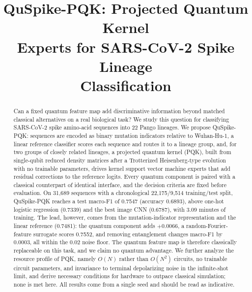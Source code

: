 \documentclass[conference]{IEEEtran}
\begin{document}
\raggedbottom

\title{QuSpike-PQK: Projected Quantum Kernel\\
Experts for SARS-CoV-2 Spike Lineage\\
Classification}
\author{}
\maketitle

\begin{abstract}
Can a fixed quantum feature map add discriminative information beyond matched classical alternatives on a real biological task? We study this question for classifying SARS-CoV-2 spike amino-acid sequences into 22 Pango lineages. We propose QuSpike-PQK: sequences are encoded as binary mutation indicators relative to Wuhan-Hu-1, a linear reference classifier scores each sequence and routes it to a lineage group, and, for two groups of closely related lineages, a projected quantum kernel (PQK), built from single-qubit reduced density matrices after a Trotterized Heisenberg-type evolution with no trainable parameters, drives kernel support vector machine experts that add residual corrections to the reference logits. Every quantum component is paired with a classical counterpart of identical interface, and the decision criteria are fixed before evaluation. On 31,689 sequences with a chronological 22,175/9,514 training/test split, QuSpike-PQK reaches a test macro-F1 of 0.7547 (accuracy 0.6893), above one-hot logistic regression (0.7339) and the best image CNN (0.6787), with 3.09 minutes of training. The lead, however, comes from the mutation-indicator representation and the linear reference (0.7481): the quantum component adds $+0.0066$, a random-Fourier-feature surrogate scores 0.7552, and removing entanglement changes macro-F1 by 0.0003, all within the 0.02 noise floor. The quantum feature map is therefore classically replaceable on this task, and we claim no quantum advantage. We further analyze the resource profile of PQK, namely $O(N)$ rather than $O(N^2)$ circuits, no trainable circuit parameters, and invariance to terminal depolarizing noise in the infinite-shot limit, and derive necessary conditions for hardware to outpace classical simulation; none is met here. All results come from a single seed and should be read as indicative.
\end{abstract}
\end{document}
